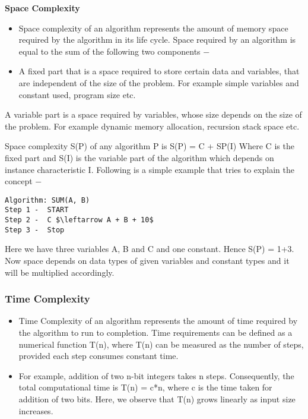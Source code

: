 \documentclass{beamer}
\begin{document}
\begin{frame}
\noindent \textbf{Space Complexity}
\begin{itemize}
\item Space complexity of an algorithm represents the amount of memory space required by the algorithm in its life cycle. Space required by an algorithm is equal to the sum of the following two components −
	
\item A fixed part that is a space required to store certain data and variables, that are independent of the size of the problem. For example simple variables and constant used, program size etc.
\end{itemize}

\end{frame}
\begin{frame}
A variable part is a space required by variables, whose size depends on the size of the problem. For example dynamic memory allocation, recursion stack space etc.

Space complexity S(P) of any algorithm P is S(P) = C + SP(I) Where C is the fixed part and S(I) is the variable part of the algorithm which depends on instance characteristic I. Following is a simple example that tries to explain the concept −
\end{frame}
\begin{frame}[fragile]
	\begin{verbatim}
Algorithm: SUM(A, B)
Step 1 -  START
Step 2 -  C $\leftarrow A + B + 10$
Step 3 -  Stop
\end{verbatim}
Here we have three variables A, B and C and one constant. Hence S(P) = 1+3. Now space depends on data types of given variables and constant types and it will be multiplied accordingly.
\end{frame}
\begin{frame}
\frametitle{Time Complexity}
\begin{itemize}
\item Time Complexity of an algorithm represents the amount of time required by the algorithm to run to completion. Time requirements can be defined as a numerical function T(n), where T(n) can be measured as the number of steps, provided each step consumes constant time.

\item For example, addition of two n-bit integers takes n steps. Consequently, the total computational time is T(n) = c*n, where c is the time taken for addition of two bits. Here, we observe that T(n) grows linearly as input size increases.
\end{itemize}
\end{frame}
\end{document}
